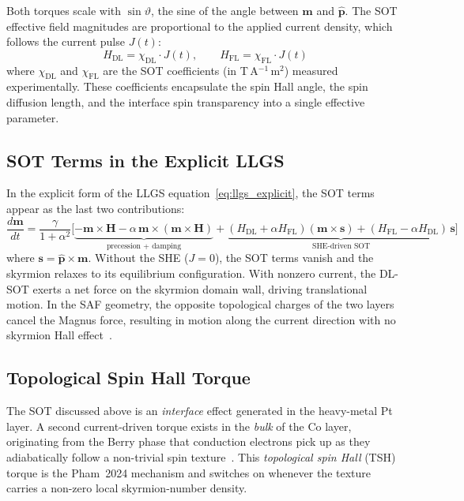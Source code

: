 \documentclass[11pt,a4paper]{article}
\newcommand{\mb}[1]{\mathbf{#1}}
\newcommand{\phat}{\hat{\mb{p}}}
\begin{document}
Both torques scale with $\sin\vartheta$, the sine of the angle
between $\mb{m}$ and $\phat$.  The SOT effective field magnitudes
are proportional to the applied current density, which follows the
current pulse $J(t)$:
%
\begin{equation}
H_{\text{DL}} = \chi_{\text{DL}} \cdot J(t),
\qquad
H_{\text{FL}} = \chi_{\text{FL}} \cdot J(t)
\end{equation}
%
where $\chi_{\text{DL}}$ and $\chi_{\text{FL}}$ are the SOT
coefficients (in T\,A$^{-1}$\,m$^2$) measured experimentally.
These coefficients encapsulate the spin Hall angle, the spin
diffusion length, and the interface spin transparency into a single
effective parameter.

\subsection{SOT Terms in the Explicit LLGS}

In the explicit form of the LLGS equation~\eqref{eq:llgs_explicit},
the SOT terms appear as the last two contributions:
%
\begin{equation}
\frac{d\mb{m}}{dt} = \frac{\gamma}{1+\alpha^2} \Big[
    \underbrace{
        -\mb{m} \times \mb{H}
        - \alpha\,\mb{m} \times (\mb{m} \times \mb{H})
    }_{\text{precession + damping}}
    + \underbrace{
        (H_{\text{DL}} + \alpha H_{\text{FL}})
            (\mb{m} \times \mb{s})
        + (H_{\text{FL}} - \alpha H_{\text{DL}})\,\mb{s}
    }_{\text{SHE-driven SOT}}
\Big]
\end{equation}
%
where $\mb{s} = \phat \times \mb{m}$.
Without the SHE ($J = 0$), the SOT terms vanish and the skyrmion
relaxes to its equilibrium configuration.  With nonzero current,
the DL-SOT exerts a net force on the skyrmion domain wall, driving
translational motion.  In the SAF geometry, the opposite topological
charges of the two layers cancel the Magnus force, resulting in
motion along the current direction with no skyrmion Hall
effect~\cite{pham2024}.

\subsection{Topological Spin Hall Torque}
\label{sec:tsh}

The SOT discussed above is an \emph{interface} effect generated in
the heavy-metal Pt layer.  A second current-driven torque exists in
the \emph{bulk} of the Co layer, originating from the Berry phase
that conduction electrons pick up as they adiabatically follow a
non-trivial spin texture~\cite{bruno2004, yin2015}.  This
\emph{topological spin Hall} (TSH) torque is the Pham~2024
mechanism and switches on whenever the
texture carries a non-zero local skyrmion-number density.
\end{document}
